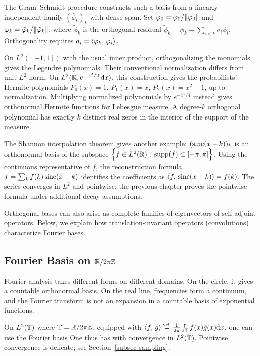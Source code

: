 The Gram--Schmidt procedure constructs such a basis from a linearly independent family $(\bar\phi_k)_k$ with dense span. Set $\varphi_0=\bar{\varphi}_0/\lVert\bar{\varphi}_0\rVert$ and $\varphi_k=\tilde{\varphi}_k/\lVert\tilde{\varphi}_k\rVert$, where $\tilde\phi_k$ is the orthogonal residual $\tilde\phi_k=\bar\phi_k - \sum_{i<k} a_i \phi_i$. Orthogonality requires $a_i = \langle \bar {\varphi}_k,\,\varphi_i\rangle$.

On $L^2([-1,1])$ with the usual inner product, orthogonalizing the monomials gives the Legendre polynomials. Their conventional normalization differs from unit $L^2$ norm:
On $L^2(\mathbb{R},e^{-x^2/2}\,\mathrm{d} x)$, this construction gives the probabilists' Hermite polynomials $P_0(x)=1$, $P_1(x)=x$, $P_2(x)=x^2-1$, up to normalization. Multiplying normalized polynomials by $e^{-x^2/4}$ instead gives orthonormal Hermite functions for Lebesgue measure. A degree-$k$ orthogonal polynomial has exactly $k$ distinct real zeros in the interior of the support of the measure.

The Shannon interpolation theorem gives another example: $( \operatorname{sinc}(x-k) )_k$ is an orthonormal basis of the subspace $\left\{ f\in L^2(\mathbb{R}) \;;\; \operatorname{supp}(\hat f) \subset [-\pi,\pi] \right\}$. Using the continuous representative of $f$, the reconstruction formula $f=\sum_k f(k) \operatorname{sinc}(x-k)$ identifies the coefficients as $\langle f,\,\operatorname{sinc}(x-k)\rangle = f(k)$. The series converges in $L^2$ and pointwise; the previous chapter proves the pointwise formula under additional decay assumptions.


Orthogonal bases can also arise as complete families of eigenvectors of self-adjoint operators. Below, we explain how translation-invariant operators (convolutions) characterize Fourier bases.


\subsection{Fourier Basis on \texorpdfstring{$\mathbb{R}/2\pi\mathbb{Z}$}{the Circle}}

Fourier analysis takes different forms on different domains. On the circle, it gives a countable orthonormal basis. On the real line, frequencies form a continuum, and the Fourier transform is not an expansion in a countable basis of exponential functions.

On $L^2(\mathbb{T})$ where $\mathbb{T}=\mathbb{R}/2\pi\mathbb{Z}$, equipped with $\langle f,\,g\rangle \stackrel{\mbox{\upshape\tiny def.}}{=} \frac{1}{2\pi}\int_{\mathbb{T}} f(x) \bar g(x) \mathrm{d} x$, one can use the Fourier basis 
One thus has
with convergence in $L^2(\mathbb{T})$. Pointwise convergence is delicate; see Section~\ref{subsec-sampling}.

